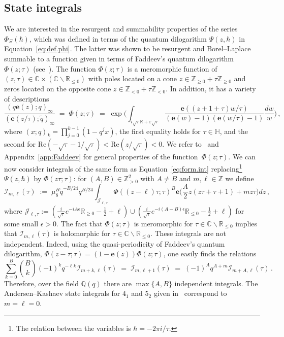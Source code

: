 \documentclass[12pt,reqno]{amsart}
\theoremstyle{definition}
\def\BZ{\mathbb Z}
\def\BQ{\mathbb Q}
\def\BR{\mathbb R}
\def\BC{\mathbb C}
\def\BH{\mathbb H}
\def\calI{\mathcal I}
\def\calJ{\mathcal J}
\def\Re{\mathrm{Re}}
\def\be{\begin{equation}}
\def\ee{\end{equation}}
\def\e{\mathbf e}
\renewcommand{\=}{\;=\;}
\newcommand{\tq}{\widetilde q}
\begin{document}
\subsection{State integrals}
We are interested in the resurgent and summability properties of the series $\Phi_{\Xi}(\hbar)$, which was defined in terms of the quantum dilogarithm $\Psi(z,\hbar)$ in Equation~\eqref{eq:def.phi}. The latter was shown to be resurgent and Borel--Laplace summable to a function given in terms of Faddeev's quantum dilogarithm $\Phi(z;\tau)$ (see~\cite{GK:resQD,andersen.mero}). The function $\Phi(z;\tau)$ is a meromorphic function of $(z,\tau)\in\BC\times(\BC\backslash\BR_{\leq0})$ with poles located on a cone $z\in\BZ_{\geq0}+\tau\BZ_{\geq0}$ and zeros located on the opposite cone $z\in\BZ_{<0}+\tau\BZ_{<0}$. In addition, it has a variety of descriptions
\be\label{eq:fad.expressions}
  \frac{(q\e(z);q)_{\infty}}{(\e(z/\tau);\tq)_{\infty}}
  \=
  \Phi(z;\tau)
  \=
  \exp\Big(
    \int_{i\sqrt{\tau}\BR+\varepsilon\sqrt{\tau}}\frac{\e((z+1+\tau)w/\tau)}{(\e(w)-1)(\e(w/\tau)-1)}
    \frac{dw}{w}
  \Big)\,,
\ee
where $(x;q)_{k}=\prod_{j=0}^{k-1}(1-q^jx)$, the first equality holds for $\tau\in\BH$, and the second for $\Re(-\sqrt{\tau}-1/\sqrt{\tau})<\Re(z/\sqrt{\tau})<0$. We refer to~\cite{AK:I,Faddeev} and Appendix~\ref{app:Faddeev} for general properties of the function~$\Phi(z;\tau)$. We can now consider integrals of the same form as Equation~\eqref{eq:form.int} replacing\footnote{The relation between the variables is $\hbar=-2\pi i/\tau$.} $\Psi(z,\hbar)$ by $\Phi(z\tau;\tau)$: for $(A,B)\in\BZ_{>0}^2$ with $A\neq B$ and $m,\ell\in\BZ$ we define
\be\label{eq:state_int}
\calI_{m,\ell}(\tau)
\;:=\;
\mu_8^B\tq^{-B/24}q^{B/24}
\int_{\calJ_{\ell,\tau}}\Phi((z-\ell)\tau;\tau)^B \e\Big(\frac{A}{2} z(z\tau+\tau+1)+mz\tau\Big) dz\,,
\ee
where $\calJ_{\ell,\tau}:=(\tfrac{i}{\sqrt{\tau}}e^{-iA\epsilon}\BR_{\geq0}-\frac{1}{2}+\ell)\cup(\tfrac{i}{\sqrt{\tau}}e^{-i(A-B)\epsilon}\BR_{\leq0}-\frac{1}{2}+\ell)$ for some small $\epsilon>0$. The fact that $\Phi(z;\tau)$ is meromorphic for $\tau\in\BC\backslash\BR_{\leq0}$ implies that $\calI_{m,\ell}(\tau)$ is holomorphic for $\tau\in\BC\backslash\BR_{\leq0}$.
These integrals are not independent. Indeed, using the quasi-periodicity of Faddeev's quantum dilogarithm, $\Phi(z-\tau;\tau)=(1-\e(z))\Phi(z;\tau)$,
one easily finds the relations
\be\label{eq:state_integral_1}
\sum_{k=0}^B\binom{B}{k}(-1)^kq^{-\ell k}\calI_{m+ k,\ell}(\tau)
\=
\calI_{m,\ell+1}(\tau)
\=(-1)^A q^{A+m}\calI_{m+ A,\ell}(\tau)\,.
\ee
Therefore, over the field $\BQ(q)$ there are $\max\{A,B\}$ independent integrals. The Andersen--Kashaev state integrals for $4_1$ and $5_2$ given in~\cite{AK:I} correspond to $m=\ell=0$. 
\end{document}
